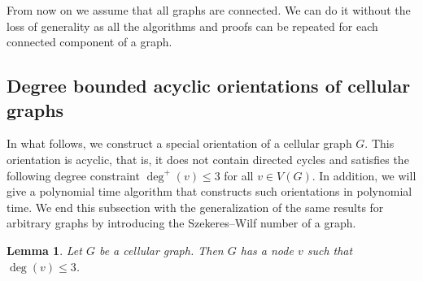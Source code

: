 \documentclass[a4paper, 12pt]{article}
\newtheorem{lem}{Lemma}[section]
\begin{document}
From now on we assume that all graphs are connected. We can do it without the loss of generality as all the algorithms and proofs can be repeated for each connected component of a graph.

\subsection{Degree bounded acyclic orientations of cellular graphs}\label{sec:orientation}

In what follows, we construct a special orientation of a cellular graph $G$. This orientation is acyclic, that is, it does not contain directed cycles and satisfies the following degree constraint $\deg^+(v) \leqslant 3$ for all $v \in V(G)$. In addition, we will give a polynomial time algorithm that constructs such orientations in polynomial time. We end this subsection with the generalization of the same results for arbitrary graphs by introducing the Szekeres\---Wilf number of a graph.


\begin{lem}\label{lem:degree-constraint}
Let $G$ be a cellular graph. Then $G$ has a node $v$ such that $\deg(v) \leqslant 3$.
\end{lem}
\end{document}
